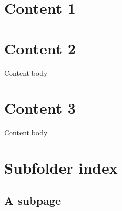 

\pagestyle{empty}
\sphinxmaketitle
\pagestyle{plain}
\sphinxtableofcontents
\pagestyle{normal}
\label{\detokenize{index::doc}}


\sphinxAtStartPar
{}


\section{Content 1}
\label{\detokenize{content1:content-1}}\label{\detokenize{content1::doc}}

\section{Content 2}
\label{\detokenize{content2:content-2}}\label{\detokenize{content2::doc}}
\sphinxAtStartPar
Content body


\section{Content 3}
\label{\detokenize{content3:content-3}}\label{\detokenize{content3::doc}}
\sphinxAtStartPar
Content body


\section{Subfolder index}
\label{\detokenize{subfolder/index:subfolder-index}}\label{\detokenize{subfolder/index::doc}}
\sphinxAtStartPar
{}


\subsection{A subpage}
\label{\detokenize{subfolder/asubpage:a-subpage}}\label{\detokenize{subfolder/asubpage::doc}}






\renewcommand{\indexname}{Index}
\printindex
